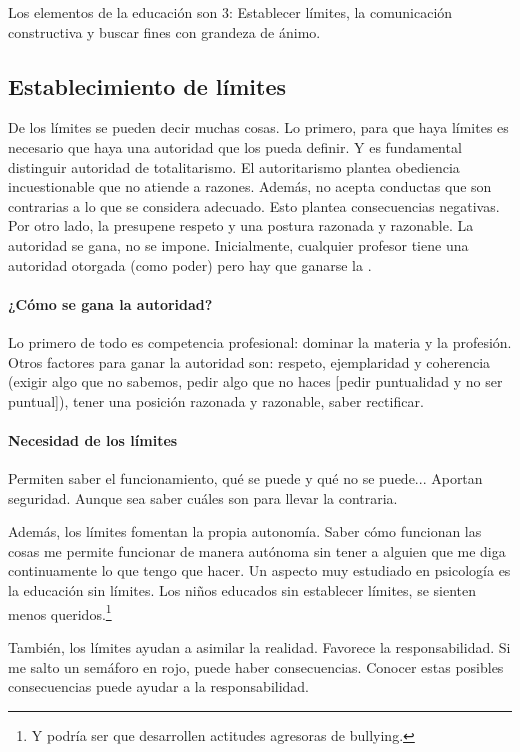 \documentclass[palatino]{apuntesURJC}
\begin{document}
Los elementos de la educación son 3: Establecer límites, la comunicación constructiva y buscar fines con grandeza de ánimo.

\subsection{Establecimiento de límites}

De los límites se pueden decir muchas cosas. 
%
Lo primero, para que haya límites es necesario que haya una autoridad que los pueda definir.
%
Y es fundamental distinguir autoridad de totalitarismo.
%
El autoritarismo plantea obediencia incuestionable que no atiende a razones. 
%
Además, no acepta conductas que son contrarias a lo que se considera adecuado.
%
Esto plantea consecuencias negativas.
%
Por otro lado, la  presupene respeto y una postura razonada y razonable.
%
La autoridad se gana, no se impone. 
%
Inicialmente, cualquier profesor tiene una autoridad otorgada (como poder) pero hay que ganarse la .

\paragraph{¿Cómo se gana la autoridad?} Lo primero de todo es competencia profesional: dominar la materia y la profesión. 
%
Otros factores para ganar la autoridad son: respeto, ejemplaridad y coherencia (exigir algo que no sabemos, pedir algo que no haces [pedir puntualidad y no ser puntual]), tener una posición razonada y razonable, saber rectificar.

\paragraph{Necesidad de los límites} Permiten saber el funcionamiento, qué se puede y qué no se puede... Aportan seguridad. Aunque sea saber cuáles son para llevar la contraria.

Además, los límites fomentan la propia autonomía. 
%
Saber cómo funcionan las cosas me permite funcionar de manera autónoma sin tener a alguien que me diga continuamente lo que tengo que hacer.
%
Un aspecto muy estudiado en psicología es la educación sin límites. 
%
Los niños educados sin establecer límites, se sienten menos queridos.\footnote{Y podría ser que desarrollen actitudes agresoras de bullying.}

También, los límites ayudan a asimilar la realidad. 
%
Favorece la responsabilidad.
%
Si me salto un semáforo en rojo, puede haber consecuencias. 
%
Conocer estas posibles consecuencias puede ayudar a la responsabilidad.
\end{document}
